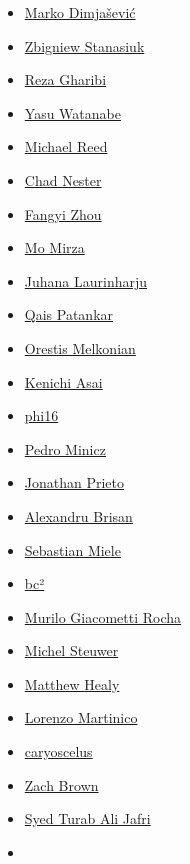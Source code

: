 \begin{itemize}
\tightlist
\item
  \href{https://github.com/mdimjasevic}{Marko Dimjašević}
\item
  \href{https://github.com/Kwezan}{Zbigniew Stanasiuk}
\item
  \href{https://github.com/h4iku}{Reza Gharibi}
\item
  \href{https://github.com/ywata}{Yasu Watanabe}
\item
  \href{https://github.com/mreed20}{Michael Reed}
\item
  \href{https://github.com/Cubesoup}{Chad Nester}
\item
  \href{https://github.com/fangyi-zhou}{Fangyi Zhou}
\item
  \href{https://github.com/momirza}{Mo Mirza}
\item
  \href{https://github.com/Fingerzam}{Juhana Laurinharju}
\item
  \href{https://github.com/qaisjp}{Qais Patankar}
\item
  \href{https://github.com/omelkonian}{Orestis Melkonian}
\item
  \href{https://github.com/kenichi-asai}{Kenichi Asai}
\item
  \href{https://github.com/phi16}{phi16}
\item
  \href{https://github.com/pedrominicz}{Pedro Minicz}
\item
  \href{https://github.com/jonaprieto}{Jonathan Prieto}
\item
  \href{https://github.com/abrisan}{Alexandru Brisan}
\item
  \href{https://github.com/whxvd}{Sebastian Miele}
\item
  \href{https://github.com/odanoburu}{bc²}
\item
  \href{https://github.com/murilogiacometti}{Murilo Giacometti Rocha}
\item
  \href{https://github.com/michel-steuwer}{Michel Steuwer}
\item
  \href{https://github.com/matthew-healy}{Matthew Healy}
\item
  \href{https://github.com/lzmartinico}{Lorenzo Martinico}
\item
  \href{https://github.com/caryoscelus}{caryoscelus}
\item
  \href{https://github.com/zachrbrown}{Zach Brown}
\item
  \href{https://github.com/trajafri}{Syed Turab Ali Jafri}
\item

\end{itemize}

